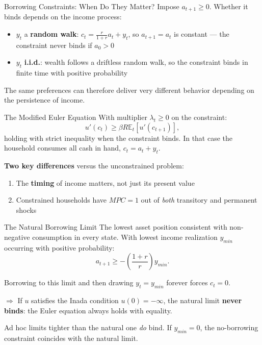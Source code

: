 \documentclass[blue]{beamer}
\newcommand{\E}{\mathbb{E}}
\begin{document}
	\begin{frame}{Borrowing Constraints: When Do They Matter?}
		Impose $a_{t+1} \geq 0$. Whether it binds depends on the income process:
		\begin{itemize}
			\item $y_t$ a \textbf{random walk}: $c_t = \frac{r}{1+r}a_t + y_t$, so $a_{t+1} = a_t$ is constant --- the constraint never binds if $a_0 > 0$
			\item $y_t$ \textbf{i.i.d.}: wealth follows a driftless random walk, so the constraint binds in finite time with positive probability
		\end{itemize}
		
		\bigskip
		The same preferences can therefore deliver very different behavior depending on the persistence of income.
	\end{frame}
	
	\begin{frame}{The Modified Euler Equation}
		With multiplier $\lambda_t \geq 0$ on the constraint:
		\[
		u'(c_t) \geq \beta R \E_t[u'(c_{t+1})],
		\]
		holding with strict inequality when the constraint binds. In that case the household consumes all cash in hand, $c_t = a_t + y_t$.
		
		\bigskip
		\textbf{Two key differences} versus the unconstrained problem:
		\begin{enumerate}
			\item The \textbf{timing} of income matters, not just its present value
			\item Constrained households have $MPC = 1$ out of \emph{both} transitory and permanent shocks
		\end{enumerate}
	\end{frame}
	
	\begin{frame}{The Natural Borrowing Limit}
		The lowest asset position consistent with non-negative consumption in every state. With lowest income realization $y_{min}$ occurring with positive probability:
		\[
		a_{t+1} \geq -\left(\frac{1+r}{r}\right) y_{min}.
		\]
		
		Borrowing to this limit and then drawing $y_t = y_{min}$ forever forces $c_t = 0$.
		
		\bigskip
		$\Rightarrow$ If $u$ satisfies the Inada condition $u(0) = -\infty$, the natural limit \textbf{never binds}: the Euler equation always holds with equality.
		
		\bigskip
		Ad hoc limits tighter than the natural one \emph{do} bind. If $y_{min} = 0$, the no-borrowing constraint coincides with the natural limit.
	\end{frame}
	
\end{document}
